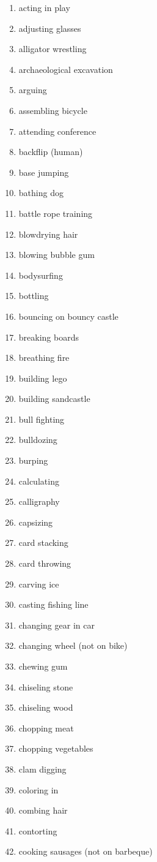 \documentclass[10pt,twocolumn,letterpaper]{article}
\begin{document}
\begin{enumerate}
\itemsep0em 
\item acting in play
\item adjusting glasses
\item alligator wrestling
\item archaeological excavation
\item arguing
\item assembling bicycle
\item attending conference
\item backflip (human)
\item base jumping
\item bathing dog
\item battle rope training
\item blowdrying hair
\item blowing bubble gum
\item bodysurfing
\item bottling
\item bouncing on bouncy castle
\item breaking boards
\item breathing fire
\item building lego
\item building sandcastle
\item bull fighting
\item bulldozing
\item burping
\item calculating
\item calligraphy
\item capsizing
\item card stacking
\item card throwing
\item carving ice
\item casting fishing line
\item changing gear in car
\item changing wheel (not on bike)
\item chewing gum
\item chiseling stone
\item chiseling wood
\item chopping meat
\item chopping vegetables
\item clam digging
\item coloring in
\item combing hair
\item contorting
\item cooking sausages (not on barbeque)

\end{enumerate}
\end{document}
